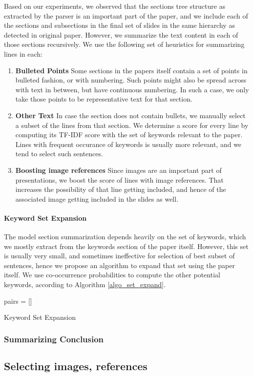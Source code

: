 Based on our experiments, we observed that the sections tree structure as extracted
by the parser is an important part of the paper, and we include each of the sections
and subsections in the final set of slides in the same hierarchy as detected
in original paper. However, we summarize the text content in each of those sections
recursively. We use the following set of heuristics for summarizing lines in each:
\begin{enumerate}
	\item \textbf{Bulleted Points} Some sections in the papers itself contain a set of
	points in bulleted fashion, or with numbering. Such points might also be spread
	across with text in between, but have continuous numbering. In such a case, we
	only take those points to be representative text for that section.
	\item \textbf{Other Text} In case the section does not contain bullets, we manually
	select a subset of the lines from that section. We determine a score for every line
	by computing its TF-IDF score with the set of keywords relevant to the paper. 
	Lines with frequent occurance of keywords is usually more relevant, and 
	we tend to select such sentences.
	\item \textbf{Boosting image references} Since images are an important 
	part of presentations, we boost the score of lines with image references.
	That increases the possibility of that line getting included, and hence 
	of the associated image getting included in the slides as well.
\end{enumerate}

\paragraph{Keyword Set Expansion}
The model section summarization depends heavily on the set of keywords, which we
mostly extract from the keywords section of the paper itself. However, this
set is usually very small, and sometimes ineffective for selection of best
subset of sentences, hence we propose an algorithm to expand that set 
using the paper itself. We use co-occurrence probabilities to compute the
other potential keywords, according to Algorithm \ref{algo_set_expand}. 

\begin{algorithm}[H]\label{algo_set_expand}
 \SetLine %
 pairs = []
 \caption{Keyword Set Expansion}
\end{algorithm}

\subsubsection{Summarizing Conclusion}

\subsection{Selecting images, references}

\newpage
\vspace{40mm}